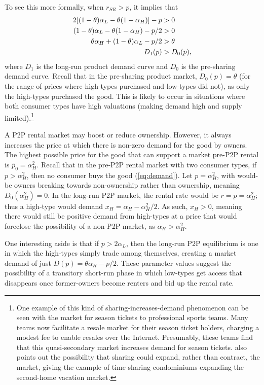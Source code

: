 \documentclass[12pt]{article}
\begin{document}
To see this more formally, when $r_{SR} > p$, it implies that
\begin{align}
 2[(1- \theta) \alpha_L - \theta(1 - \alpha_H)] - p &> 0 \notag \\
(1- \theta) \alpha_L - \theta(1 - \alpha_H) - p/2 &> 0 \notag \\
\theta \alpha_H + (1- \theta) \alpha_L - p/2 &> \theta \notag \\
 D_{1}(p) & > D_{0}(p), \notag \\
\end{align}
where $D_{1}$ is the long-run product demand curve and $D_{0}$ is the pre-sharing demand curve.
Recall that in the pre-sharing product market, $D_0(p) = \theta$ (for the range of prices where high-types purchased and low-types did not), as only the high-types purchased the good. 
This is likely to occur in situations where both consumer types have high valuations (making demand high and supply limited).\footnote{ 
  One example of this kind of sharing-increases-demand phenomenon can be seen with the market for season tickets to professional sports teams.
  Many teams now facilitate a resale market for their season ticket holders, charging a modest fee to enable resales over the Internet.
  Presumably, these teams find that this quasi-secondary market increases demand for season tickets.
  \cite{belk2014you} also points out the possibility that sharing could expand, rather than contract, the market, giving the example of time-sharing condominiums expanding the second-home vacation market. 
}

A P2P rental market may boost or reduce ownership.
However, it always increases the price at which there is non-zero demand for the good by owners. 
The highest possible price for the good that can support a market pre-P2P rental is $\bar{p}_0 = \alpha_H^2$.
Recall that in the pre-P2P rental market with two consumer types, if $p > \alpha_H^2$, then no consumer buys the good (\ref{eq:demand}).
Let $p = \alpha_H^2$, with would-be owners breaking towards non-ownership rather than ownership, meaning $D_0(\alpha_H^2) = 0$. 
In the long-run P2P market, the rental rate would be $r = p = \alpha_H^2$; thus a high-type would demand $x_H = \alpha_H - \alpha_H^2/2$.
As such, $x_H > 0$, meaning there would still be positive demand from high-types at a price that would foreclose the possibility of a non-P2P market, as  $\alpha_H > \alpha_H^2$.  

One interesting aside is that if $p > 2 \alpha_L$, then the long-run P2P equilibrium is one in which the high-types simply trade among themselves, creating a market demand of just $D(p) = \theta \alpha_H - p/2$. 
These parameter values suggest the possibility of a transitory short-run phase in which low-types get access that disappears once former-owners become renters and bid up the rental rate. 
\end{document}
